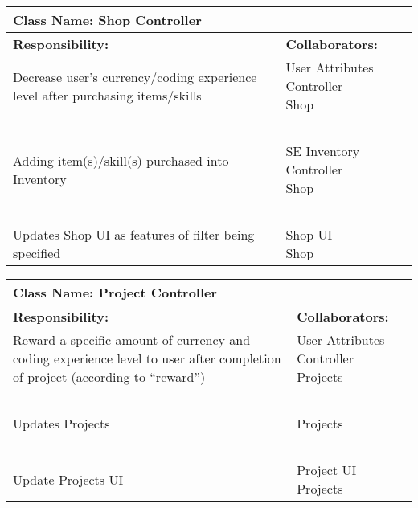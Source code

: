 \documentclass[]{article}
\begin{document}
\begin{table}[H]
    \centering
    \begin{tabular}{|p{5cm}|p{5cm}|}
        \hline
        \multicolumn{2}{|l|}{\textbf{Class Name:} Shop Controller}\\
        \hline
        \textbf{Responsibility:} & \textbf{Collaborators:}\\
        \hline
        Decrease user’s currency/coding experience level after purchasing items/skills & \makecell[l]{User Attributes Controller\\Shop}\\
        ~ & ~\\
        Adding item(s)/skill(s) purchased into Inventory & \makecell[l]{SE Inventory Controller\\Shop}\\
        ~ & ~\\
        Updates Shop UI as features of filter being specified & \makecell[l]{Shop UI\\Shop}\\
        \hline
    \end{tabular}
\end{table}

\begin{table}[H]
    \centering
    \begin{tabular}{|p{5cm}|p{5cm}|}
        \hline
        \multicolumn{2}{|l|}{\textbf{Class Name:} Project Controller}\\
        \hline
        \textbf{Responsibility:} & \textbf{Collaborators:}\\
        \hline
        Reward a specific amount of currency and coding experience level to user after completion of project (according to “reward”) & \makecell[l]{User Attributes Controller\\Projects}\\
        ~ & ~\\
        Updates Projects & Projects\\
        ~ & ~\\
        Update Projects UI & \makecell[l]{Project UI\\Projects}\\
        \hline
    \end{tabular}
\end{table}
\end{document}
